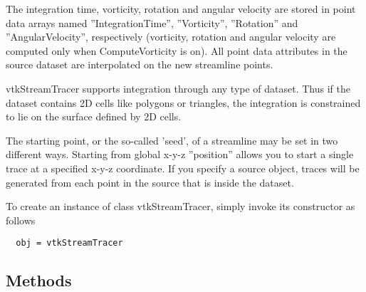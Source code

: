  The integration time, vorticity, rotation and angular velocity are stored
 in point data arrays named ''IntegrationTime'', ''Vorticity'', ''Rotation'' and
 ''AngularVelocity'', respectively (vorticity, rotation and angular velocity
 are computed only when ComputeVorticity is on). All point data attributes
 in the source dataset are interpolated on the new streamline points.

 vtkStreamTracer supports integration through any type of dataset. Thus if
 the dataset contains 2D cells like polygons or triangles, the integration
 is constrained to lie on the surface defined by 2D cells.

 The starting point, or the so-called 'seed', of a streamline may be set
 in two different ways. Starting from global x-y-z ''position'' allows you
 to start a single trace at a specified x-y-z coordinate. If you specify
 a source object, traces will be generated from each point in the source
 that is inside the dataset.


To create an instance of class vtkStreamTracer, simply
invoke its constructor as follows
\begin{verbatim}
  obj = vtkStreamTracer
\end{verbatim}
\subsection{Methods}

